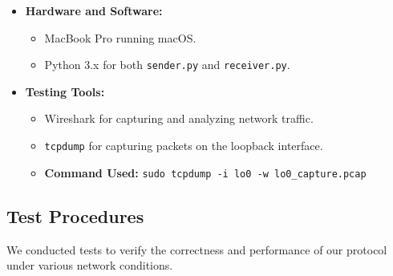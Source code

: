 \documentclass[11pt]{article}
\begin{document}
\begin{itemize}
    \item \textbf{Hardware and Software:}
    \begin{itemize}
        \item MacBook Pro running macOS.
        \item Python 3.x for both \texttt{sender.py} and \texttt{receiver.py}.
    \end{itemize}
    \item \textbf{Testing Tools:}
    \begin{itemize}
        \item Wireshark for capturing and analyzing network traffic.
        \item \texttt{tcpdump} for capturing packets on the loopback interface.
        \item \textbf{Command Used:} \texttt{sudo tcpdump -i lo0 -w lo0\_capture.pcap}
    \end{itemize}
\end{itemize}

\subsection{Test Procedures}

We conducted tests to verify the correctness and performance of our protocol under various network conditions.
\end{document}
